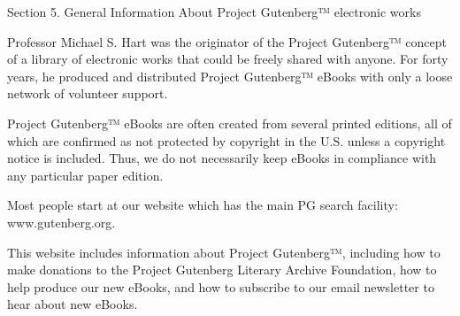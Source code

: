 Section 5. General Information About Project Gutenberg™ electronic works

Professor Michael S. Hart was the originator of the Project
Gutenberg™ concept of a library of electronic works that could be
freely shared with anyone. For forty years, he produced and
distributed Project Gutenberg™ eBooks with only a loose network of
volunteer support.

Project Gutenberg™ eBooks are often created from several printed
editions, all of which are confirmed as not protected by copyright in
the U.S. unless a copyright notice is included. Thus, we do not
necessarily keep eBooks in compliance with any particular paper
edition.

Most people start at our website which has the main PG search
facility: www.gutenberg.org.

This website includes information about Project Gutenberg™,
including how to make donations to the Project Gutenberg Literary
Archive Foundation, how to help produce our new eBooks, and how to
subscribe to our email newsletter to hear about new eBooks.

